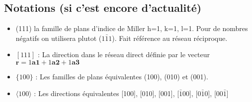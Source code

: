 \documentclass[a4paper]{report}
\begin{document}
  \subsection{Notations (si c'est encore d'actualité)}
  \begin{itemize}
  \item (111) la famille de plans d'indice de Miller h=1, k=1, l=1. Pour de nombres négatifs on utilisera plutot ($1\bar 1 1$). Fait référence au réseau réciproque.
  \item $[111]$ : La direction dans le réseau direct définie par le vecteur $\mathbf{r} = 1 \mathbf{a1} + 1 \mathbf{a2} + 1 \mathbf{a3} $
  \item $\{ 100 \}$ : Les familles de plans équivalentes (100), (010) et (001).
  \item $\langle 100 \rangle$ : Les directions équivalentes [100], [010], [001], [$\bar 1 00$], [$0\bar 1 0$], [$00\bar 1$]
  \end{itemize}
    
\end{document}
